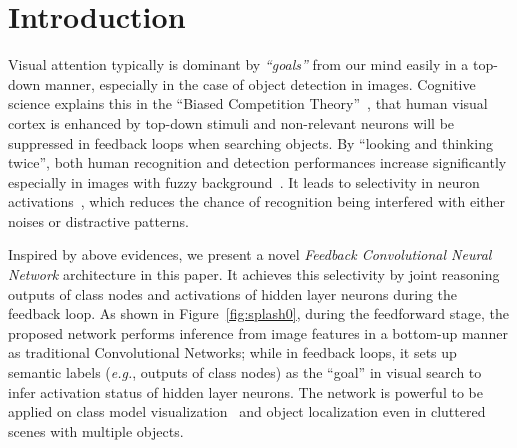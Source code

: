 \section{Introduction}

\begin{center}
\end{center}

Visual attention typically is dominant by \emph{``goals''} from our mind easily in a top-down manner, especially in the case of object detection in images. Cognitive science explains this in the ``Biased Competition Theory''~\cite{beck2009top,desimone1998visual,desimone1995neural}, that human visual cortex is enhanced by top-down stimuli and non-relevant neurons will be suppressed in feedback loops when searching objects. By ``looking and thinking twice'', both human recognition and detection performances increase significantly especially in images with fuzzy background~\cite{Cichy2014Resolving}. It leads to selectivity in neuron activations~\cite{Kruger2013Deep}, which reduces the chance of recognition being interfered with either noises or distractive patterns.

Inspired by above evidences, we present a novel \emph{Feedback Convolutional Neural Network} architecture in this paper. It achieves this selectivity by joint reasoning outputs of class nodes and activations of hidden layer neurons during the feedback loop. As shown in Figure~\ref{fig:splash0}, during the feedforward stage, the proposed network performs inference from image features in a bottom-up manner as traditional Convolutional Networks; while in feedback loops, it sets up semantic labels (\emph{e.g.}, outputs of class nodes) as the ``goal'' in visual search to infer activation status of hidden layer neurons. The network is powerful to be applied on class model visualization~\cite{simonyan2013deep, zeiler2014visualizing} and object localization even in cluttered scenes with multiple objects.

